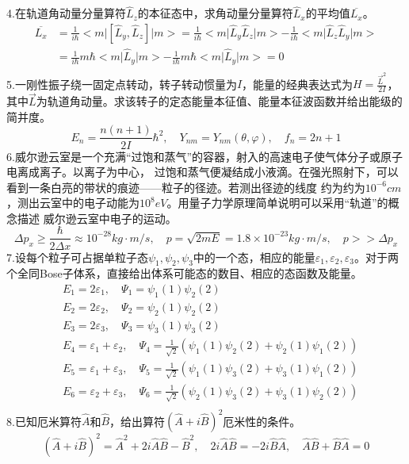 \documentclass[UTF8]{ctexart}
\begin{document}
4.在轨道角动量分量算符$\hat L_z$的本征态中，求角动量分量算符$\hat L_x$的平均值$\overline{L_x}$。\\
\begin{equation*}
  \begin{aligned}
    \overline{L_x} & =\frac{1}{i\hbar}<m\lvert[\hat L_y,\hat L_z]\rvert m>
    =\frac{1}{i\hbar}<m\lvert\hat L_y\hat L_z\rvert m>-\frac{1}{i\hbar}<m\lvert\hat L_z\hat L_y\rvert m>                \\
                   & =\frac{1}{i\hbar}m\hbar<m\lvert\hat L_y\rvert m>-\frac{1}{i\hbar}m\hbar<m\lvert\hat L_y\rvert m>=0 \\
  \end{aligned}
\end{equation*}
5.一刚性振子绕一固定点转动，转子转动惯量为$I$，能量的经典表达式为$H=\frac{\vec L^2}{2I}$，
其中$\vec L$为轨道角动量。求该转子的定态能量本征值、能量本征波函数并给出能级的简并度。\\
\begin{equation*}
  E_n=\frac{n(n+1)}{2I}\hbar^2,\quad Y_{nm}=Y_{nm}(\theta,\varphi),\quad f_n=2n+1
\end{equation*}
6.威尔逊云室是一个充满“过饱和蒸气”的容器，射入的高速电子使气体分子或原子电离成离子。以离子为中心，
过饱和蒸气便凝结成小液滴。在强光照射下，可以看到一条白亮的带状的痕迹——粒子的径迹。若测出径迹的线度
约为约为$10^{-6}cm$，测出云室中的电子动能为$10^8eV$。用量子力学原理简单说明可以采用“轨道”的概念描述
威尔逊云室中电子的运动。\\
\begin{equation*}
  \Delta p_x\geq\frac{\hbar}{2\Delta x}\approx10^{-28}kg\cdot m/s,\quad
  p=\sqrt{2mE}=1.8\times10^{-23}kg\cdot m/s,\quad p>>\Delta p_x
\end{equation*}
7.设每个粒子可占据单粒子态$\psi_1,\psi_2,\psi_3$中的一个态，相应的能量$\varepsilon_1,\varepsilon_2,
  \varepsilon_3$。对于两个全同Bose子体系，直接给出体系可能态的数目、相应的态函数及能量。\\
\begin{equation*}
  \begin{aligned}
     & E_1=2\varepsilon_1,\quad\Psi_1=\psi_1(1)\psi_2(2)           \\
     & E_2=2\varepsilon_2,\quad\Psi_2=\psi_2(1)\psi_2(2)           \\
     & E_3=2\varepsilon_3,\quad\Psi_3=\psi_3(1)\psi_3(2)           \\
     & E_4=\varepsilon_1+\varepsilon_2,\quad
    \Psi_4=\frac{1}{\sqrt2}(\psi_1(1)\psi_2(2)+\psi_2(1)\psi_1(2)) \\
     & E_5=\varepsilon_1+\varepsilon_3,\quad
    \Psi_5=\frac{1}{\sqrt2}(\psi_1(1)\psi_3(2)+\psi_3(1)\psi_1(2)) \\
     & E_6=\varepsilon_2+\varepsilon_3,\quad
    \Psi_6=\frac{1}{\sqrt2}(\psi_2(1)\psi_3(2)+\psi_3(1)\psi_2(2)) \\
  \end{aligned}
\end{equation*}
8.已知厄米算符$\hat A$和$\hat B$，给出算符$(\hat A+i\hat B)^2$厄米性的条件。
\begin{equation*}
  (\hat A+i\hat B)^2=\hat A^2+2i\hat A\hat B-\hat B^2,\quad
  2i\hat A\hat B=-2i\hat B\hat A,\quad\hat A\hat B+\hat B\hat A=0
\end{equation*}
\end{document}
